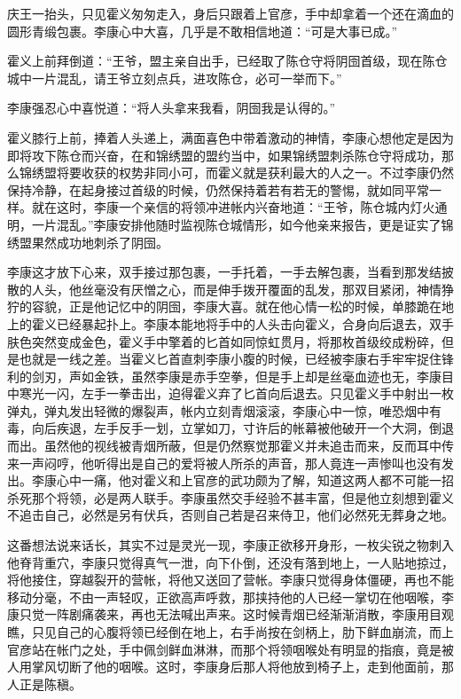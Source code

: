 庆王一抬头，只见霍义匆匆走入，身后只跟着上官彦，手中却拿着一个还在滴血的圆形青缎包裹。李康心中大喜，几乎是不敢相信地道：“可是大事已成。”

霍义上前拜倒道：“王爷，盟主亲自出手，已经取了陈仓守将阴囹首级，现在陈仓城中一片混乱，请王爷立刻点兵，进攻陈仓，必可一举而下。”

李康强忍心中喜悦道：“将人头拿来我看，阴囹我是认得的。”

霍义膝行上前，捧着人头递上，满面喜色中带着激动的神情，李康心想他定是因为即将攻下陈仓而兴奋，在和锦绣盟的盟约当中，如果锦绣盟刺杀陈仓守将成功，那么锦绣盟将要收获的权势非同小可，而霍义就是获利最大的人之一。不过李康仍然保持冷静，在起身接过首级的时候，仍然保持着若有若无的警惕，就如同平常一样。就在这时，李康一个亲信的将领冲进帐内兴奋地道：“王爷，陈仓城内灯火通明，一片混乱。”李康安排他随时监视陈仓城情形，如今他亲来报告，更是证实了锦绣盟果然成功地刺杀了阴囹。

李康这才放下心来，双手接过那包裹，一手托着，一手去解包裹，当看到那发结披散的人头，他丝毫没有厌憎之心，而是伸手拨开覆面的乱发，那双目紧闭，神情狰狞的容貌，正是他记忆中的阴囹，李康大喜。就在他心情一松的时候，单膝跪在地上的霍义已经暴起扑上。李康本能地将手中的人头击向霍义，合身向后退去，双手肤色突然变成金色，霍义手中擎着的匕首如同惊虹贯月，将那枚首级绞成粉碎，但是也就是一线之差。当霍义匕首直刺李康小腹的时候，已经被李康右手牢牢捉住锋利的剑刃，声如金铁，虽然李康是赤手空拳，但是手上却是丝毫血迹也无，李康目中寒光一闪，左手一拳击出，迫得霍义弃了匕首向后退去。只见霍义手中射出一枚弹丸，弹丸发出轻微的爆裂声，帐内立刻青烟滚滚，李康心中一惊，唯恐烟中有毒，向后疾退，左手反手一划，立掌如刀，寸许后的帐幕被他破开一个大洞，倒退而出。虽然他的视线被青烟所蔽，但是仍然察觉那霍义并未追击而来，反而耳中传来一声闷哼，他听得出是自己的爱将被人所杀的声音，那人竟连一声惨叫也没有发出。李康心中一痛，他对霍义和上官彦的武功颇为了解，知道这两人都不可能一招杀死那个将领，必是两人联手。李康虽然交手经验不甚丰富，但是他立刻想到霍义不追击自己，必然是另有伏兵，否则自己若是召来侍卫，他们必然死无葬身之地。

这番想法说来话长，其实不过是灵光一现，李康正欲移开身形，一枚尖锐之物刺入他脊背重穴，李康只觉得真气一泄，向下仆倒，还没有落到地上，一人贴地掠过，将他接住，穿越裂开的营帐，将他又送回了营帐。李康只觉得身体僵硬，再也不能移动分毫，不由一声轻叹，正欲高声呼救，那挟持他的人已经一掌切在他咽喉，李康只觉一阵剧痛袭来，再也无法喊出声来。这时候青烟已经渐渐消散，李康用目观瞧，只见自己的心腹将领已经倒在地上，右手尚按在剑柄上，肋下鲜血崩流，而上官彦站在帐门之处，手中佩剑鲜血淋淋，而那个将领咽喉处有明显的指痕，竟是被人用掌风切断了他的咽喉。这时，李康身后那人将他放到椅子上，走到他面前，那人正是陈稹。

